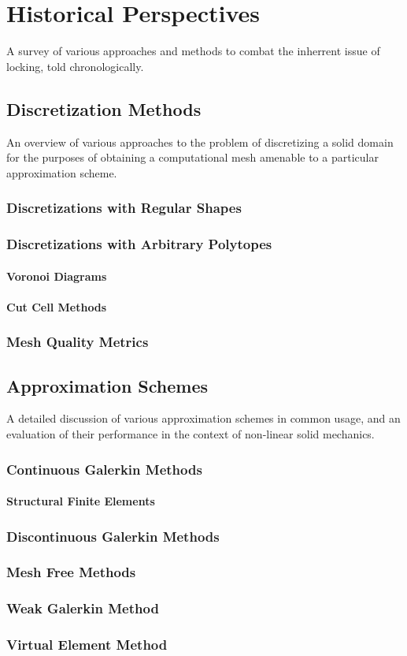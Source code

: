 \chapter{Historical Perspectives}
%
A survey of various approaches and methods to combat the inherrent issue of locking, told chronologically.

\section{Discretization Methods}
%
An overview of various approaches to the problem of discretizing a solid domain for the purposes of obtaining a computational mesh amenable to a particular approximation scheme.
\subsection{Discretizations with Regular Shapes}

\subsection{Discretizations with Arbitrary Polytopes}
\subsubsection{Voronoi Diagrams}
\subsubsection{Cut Cell Methods}

\subsection{Mesh Quality Metrics}

\section{Approximation Schemes}
%
A detailed discussion of various approximation schemes in common usage, and an evaluation of their performance in the context of non-linear solid mechanics.
\subsection{Continuous Galerkin Methods}
\subsubsection{Structural Finite Elements}

\subsection{Discontinuous Galerkin Methods}

\subsection{Mesh Free Methods}

\subsection{Weak Galerkin Method}

\subsection{Virtual Element Method}
